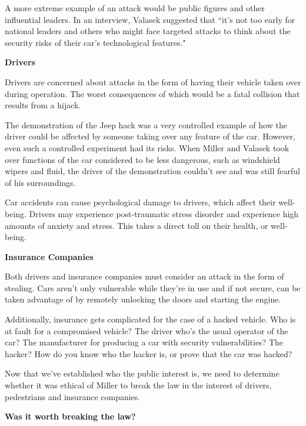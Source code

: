 \documentclass[12pt]{article}
\begin{document}
\begin{multicols}{2}
A more extreme example of an attack would be public figures and other influential leaders. In an interview, Valasek suggested that ``it's not too early for national leaders and others who might face targeted attacks to think about the security risks of their car's technological features."\cite{hackingRisk}

\vspace{.2cm}\textbf{Drivers}

 Drivers are concerned about attacks in the form of having their vehicle taken over during operation. \cite{officialPaper} The worst consequences of which would be a fatal collision that results from a hijack. 

The demonstration of the Jeep hack was a very controlled example of how the driver could be affected by someone taking over any feature of the car. However, even such a controlled experiment had its risks. When Miller and Valasek took over functions of the car considered to be less dangerous, such as windshield wipers and fluid, the driver of the demonstration couldn't see and was still fearful of his surroundings.\cite{dangerousJeepHack}\cite{wired}

Car accidents can cause psychological damage to drivers, which affect their well-being. Drivers may experience post-traumatic stress disorder and experience high amounts of anxiety and stress.\cite{trauma} This takes a direct toll on their health, or well-being. 

\vspace{.2cm}\textbf{Insurance Companies}

Both drivers and insurance companies must consider an attack in the form of stealing. Cars aren't only vulnerable while they're in use and if not secure, can be taken advantage of by remotely unlocking the doors and starting the engine. \cite{hackingRisk}

Additionally, insurance gets complicated for the case of a hacked vehicle. Who is at fault for a compromised vehicle? The driver who's the usual operator of the car? The manufacturer for producing a car with security vulnerabilities? The hacker? How do you know who the hacker is, or prove that the car was hacked?  \cite{alanna}

Now that we've established who the public interest is, we need to determine whether it was ethical of Miller to break the law in the interest of drivers, pedestrians and insurance companies.

\vspace{.2cm}\textbf{Was it worth breaking the law?}


\end{multicols}
\end{document}
